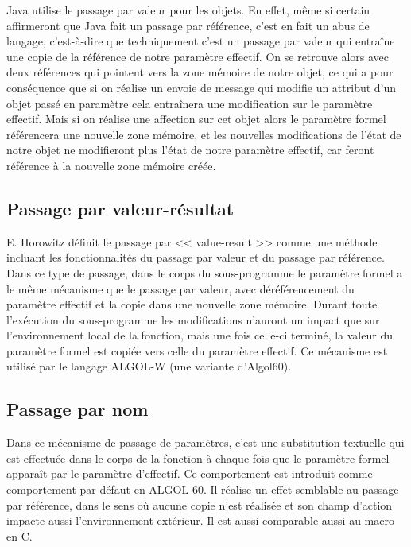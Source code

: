     Java \cite{Gosling:2005:JLS:1036643} utilise le passage par valeur pour les objets. En effet, même si certain affirmeront que Java fait un passage par référence, c'est en fait un abus de langage, c'est-à-dire que techniquement c'est un passage par valeur qui entraîne une copie de la référence de notre paramètre effectif. On se retrouve alors avec deux références qui pointent vers la zone mémoire de notre objet, ce qui a pour conséquence que si on réalise un envoie de message qui modifie un attribut d'un objet passé en paramètre cela entraînera une modification sur le paramètre effectif. Mais si on réalise une affection sur cet objet alors le paramètre formel référencera une nouvelle zone mémoire, et les nouvelles modifications de l'état de notre objet ne modifieront plus l'état de notre paramètre effectif, car feront référence à la nouvelle zone mémoire créée. 
      
    \subsection{Passage par valeur-résultat}
    
    E. Horowitz définit le passage par << value-result >> \cite{Horowitz:1984:FPL:27635} comme une méthode incluant les fonctionnalités du passage par valeur et du passage par référence. Dans ce type de passage, dans le corps du sous-programme le paramètre formel a le même mécanisme que le passage par valeur, avec déréférencement du paramètre effectif et la copie dans une nouvelle zone mémoire. Durant toute l'exécution du sous-programme les modifications n'auront un impact que sur l'environnement local de la fonction, mais une fois celle-ci terminé, la valeur du paramètre formel est copiée vers celle du paramètre effectif. Ce mécanisme est utilisé par le langage ALGOL-W \cite{sites1972algol} (une variante d'Algol60).
    
    \subsection{Passage par nom}
    
  Dans ce mécanisme de passage de paramètres, c'est une substitution textuelle qui est effectuée dans le corps de la fonction à chaque fois que le paramètre formel apparaît par le paramètre d'effectif. Ce comportement est introduit comme comportement par défaut en ALGOL-60. Il réalise un effet semblable au passage par référence, dans le sens où aucune copie n'est réalisée et son champ d'action impacte aussi l’environnement extérieur. Il est aussi comparable aussi au macro en C.
    
